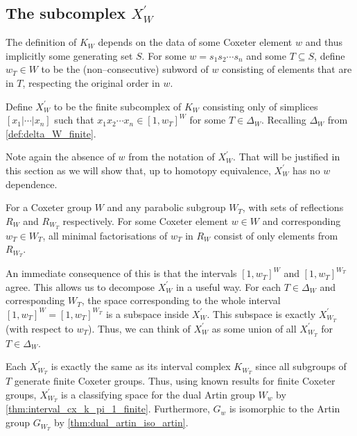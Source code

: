 \documentclass[class=article, crop=false]{standalone}
\begin{document}
\subsection{The subcomplex $X_{W}^\prime$}
The definition of $K_{W}$ depends on the data of some Coxeter element $w$ and thus implicitly some generating set $S$. For some $w = s_1s_2\cdots s_n$ and some $T\subseteq S$, define $w_T\in W$ to be the (non--consecutive) subword of $w$ consisting of elements that are in $T$, respecting the original order in $w$. 
\begin{definition}
    Define $X_{W}^\prime$ to be the finite subcomplex of $K_{W}$ consisting only of simplices $[x_1 | \cdots | x_n]$ such that $x_1x_2\cdots x_n \in [1,w_T]^W$ for some $T \in \Delta_W$. Recalling $\Delta_W$ from \cref{def:delta_W_finite}.
    \label{def:subcomplex_X_prime}
\end{definition}
Note again the absence of $w$ from the notation of $X^\prime_W$. That will be justified in this section as we will show that, up to homotopy equivalence, $X_W^\prime$ has no $w$ dependence.

\begin{lemma}[{\cite[Lemma 5.2]{paolini_salvetti_kpi1_2021}}]
    For a Coxeter group $W$ and any parabolic subgroup $W_T$, with sets of reflections $R_W$ and $R_{W_T}$ respectively. For some Coxeter element $w \in W$ and corresponding $w_T \in W_T$, all minimal factorisations of $w_T$ in $R_W$ consist of only elements from $R_{W_T}$.
    \label{lem:all_decompositions_of_w_T_are_R}
\end{lemma}
An immediate consequence of this is that the intervals $[1,w_T]^W$ and $[1,w_T]^{W_T}$ agree. This allows us to decompose $X^\prime_W$ in a useful way. For each $T \in \Delta_W$ and corresponding $W_T$, the space corresponding to the whole interval $[1, w_T]^W=[1,w_T]^{W_T}$ is a subspace inside $X^\prime_W$. This subspace is exactly $X^\prime_{W_T}$ (with respect to $w_T$). Thus, we can think of $X^\prime_W$ as some union of all $X^\prime_{W_T}$ for $T \in \Delta_W$.

Each $X^\prime_{W_T}$ is exactly the same as its interval complex $K_{{W_T}}$ since all subgroups of $T$ generate finite Coxeter groups. Thus, using known results for finite Coxeter groups, $X^\prime_{W_T}$ is a classifying space for the dual Artin group $W_w$ by \cref{thm:interval_cx_k_pi_1_finite}. Furthermore, $G_w$ is isomorphic to the Artin group $G_{W_T}$ by \cref{thm:dual_artin_iso_artin}.
\end{document}
